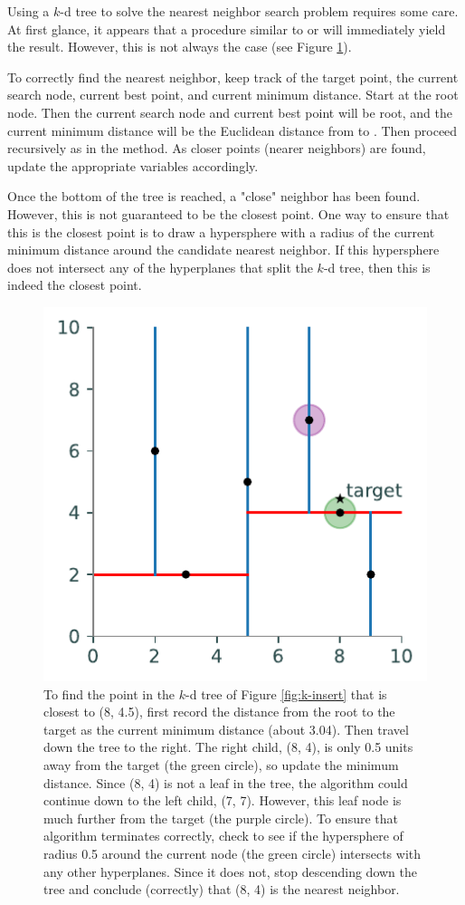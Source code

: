 Using a $k$-d tree to solve the nearest neighbor search problem requires some care.
At first glance, it appears that a procedure similar to  or  will immediately yield the result.
However, this is not always the case (see Figure \ref{fig:bad-search}).

To correctly find the nearest neighbor, keep track of the target point, the current search node, current best point, and current minimum distance.
Start at the root node.
Then the current search node and current best point will be root, and the current minimum distance will be the Euclidean distance from  to .
Then proceed recursively as in the  method.
As closer points (nearer neighbors) are found, update the appropriate variables accordingly.

Once the bottom of the tree is reached, a "close" neighbor has been found.
However, this is not guaranteed to be the closest point.
One way to ensure that this is the closest point is to draw a hypersphere with a radius of the current minimum distance around the candidate nearest neighbor.
If this hypersphere does not intersect any of the hyperplanes that split the $k$-d tree, then this is indeed the closest point.

\begin{figure}[H]
\includegraphics[width=.7\textwidth]{figures/kdpic6.pdf}
\caption{To find the point in the $k$-d tree of Figure \ref{fig:k-insert} that is closest to (8, 4.5), first record the distance from the root to the target as the current minimum distance (about 3.04). Then travel down the tree to the right. The right child, (8, 4), is only 0.5 units away from the target (the green circle), so update the minimum distance. Since (8, 4) is not a leaf in the tree, the algorithm could continue down to the left child, (7, 7). However, this leaf node is much further from the target (the purple circle). To ensure that algorithm terminates correctly, check to see if the hypersphere of radius 0.5 around the current node (the green circle) intersects with any other hyperplanes. Since it does not, stop descending down the tree and conclude (correctly) that (8, 4) is the nearest neighbor.}
\label{fig:bad-search}
\end{figure}

